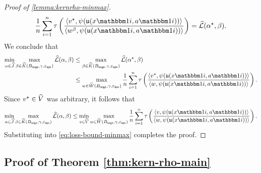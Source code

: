 \begin{proof}[Proof of \cref{lemma:kernrho-minmax}]
\[\frac{1}{n} \sum_{i=1}^n \tau\left(\frac{\langle v^\star, \psi(\uop{x\ind{i}}{a\ind{i}})\rangle}{\langle w^\beta, \psi(\uop{x\ind{i}}{a\ind{i}})\rangle}\right) = \emploss(\alpha^\star, \beta).\]
We conclude that
\begin{align}
\min_{\alpha \in \wh J} \max_{\beta \in \wh K(\Blarge,\gamma,\epapx)} \emploss(\alpha,\beta) 
&\leq \max_{\beta \in \wh K(\Blarge,\gamma,\epapx)} \emploss(\alpha^\star, \beta) \\ 
&\leq \max_{w \in \wh W(\Blarge,\gamma,\epapx)} \frac{1}{n} \sum_{i=1}^n \tau\left(\frac{\langle v^\star, \psi(\uop{x\ind{i}}{a\ind{i}})\rangle}{\langle w, \psi(\uop{x\ind{i}}{a\ind{i}})\rangle}\right).
\end{align}
Since $v^\star\in\widehat{V}$ was arbitrary, it follows that
\[\min_{\alpha \in \wh J} \max_{\beta \in \wh K(\Blarge,\gamma,\epapx)} \emploss(\alpha,\beta)  \leq \min_{v\in\wh V}\max_{w \in \wh W(\Blarge,\gamma,\epapx)} \frac{1}{n} \sum_{i=1}^n \tau\left(\frac{\langle v, \psi(\uop{x\ind{i}}{a\ind{i}})\rangle}{\langle w, \psi(\uop{x\ind{i}}{a\ind{i}})\rangle}\right).\]
Substituting into \cref{eq:loss-bound-minmax} completes the proof.
\end{proof}

\subsection{Proof of Theorem \ref*{thm:kern-rho-main}}\label{subsec:kernrho-proof}




